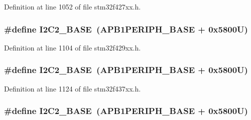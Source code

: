 Definition at line 1052 of file stm32f427xx.\+h.

\subsubsection[{\texorpdfstring{I2\+C2\+\_\+\+B\+A\+SE}{I2C2_BASE}}]{\setlength{\rightskip}{0pt plus 5cm}\#define I2\+C2\+\_\+\+B\+A\+SE~({\bf A\+P\+B1\+P\+E\+R\+I\+P\+H\+\_\+\+B\+A\+SE} + 0x5800\+U)}\hypertarget{group___peripheral__memory__map_ga04bda70f25c795fb79f163b633ad4a5d}{}\label{group___peripheral__memory__map_ga04bda70f25c795fb79f163b633ad4a5d}


Definition at line 1104 of file stm32f429xx.\+h.

\subsubsection[{\texorpdfstring{I2\+C2\+\_\+\+B\+A\+SE}{I2C2_BASE}}]{\setlength{\rightskip}{0pt plus 5cm}\#define I2\+C2\+\_\+\+B\+A\+SE~({\bf A\+P\+B1\+P\+E\+R\+I\+P\+H\+\_\+\+B\+A\+SE} + 0x5800\+U)}\hypertarget{group___peripheral__memory__map_ga04bda70f25c795fb79f163b633ad4a5d}{}\label{group___peripheral__memory__map_ga04bda70f25c795fb79f163b633ad4a5d}


Definition at line 1124 of file stm32f437xx.\+h.

\subsubsection[{\texorpdfstring{I2\+C2\+\_\+\+B\+A\+SE}{I2C2_BASE}}]{\setlength{\rightskip}{0pt plus 5cm}\#define I2\+C2\+\_\+\+B\+A\+SE~({\bf A\+P\+B1\+P\+E\+R\+I\+P\+H\+\_\+\+B\+A\+SE} + 0x5800\+U)}\hypertarget{group___peripheral__memory__map_ga04bda70f25c795fb79f163b633ad4a5d}{}\label{group___peripheral__memory__map_ga04bda70f25c795fb79f163b633ad4a5d}


